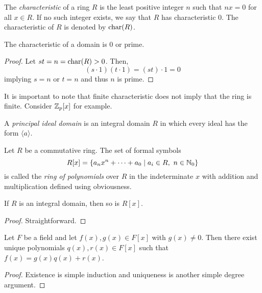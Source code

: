 \begin{definition}
    The \textit{characteristic} of a ring $R$ is the least positive integer $n$ such that $nx = 0$ for all $x\in R$. If no such integer exists, we say that $R$ has characteristic $0$. The characteristic of $R$ is denoted by $\operatornamewithlimits{char}(R)$.
\end{definition}

\begin{lemma}
    The characteristic of a domain is 0 or prime.
\end{lemma}
\begin{proof}
    Let $st = n = \operatornamewithlimits{char}(R) > 0$. Then, 
    \begin{equation*}
        (s\cdot 1)(t\cdot 1) = (st)\cdot 1 = 0
    \end{equation*}
    implying $s = n$ or $t = n$ and thus $n$ is prime.
\end{proof}

It is important to note that finite characteristic does not imply that the ring is finite. Consider $\mathbb{Z}_p[x]$ for example.

\begin{definition}
    A \textit{principal ideal domain} is an integral domain $R$ in which every ideal has the form $\langle a\rangle$.
\end{definition}

\begin{definition}
    Let $R$ be a commutative ring. The set of formal symbols 
    \begin{equation*}
        R[x] = \{a_nx^n + \cdots + a_0\mid a_i\in R,~ n\in\mathbb{N}_0\}
    \end{equation*}
    is called the \textit{ring of polynomials} over $R$ in the indeterminate $x$ with addition and multiplication defined using obviousness.
\end{definition}

\begin{lemma}
    If $R$ is an integral domain, then so is $R[x]$.
\end{lemma}
\begin{proof}
    Straightforward.
\end{proof}

\begin{theorem}
    Let $F$ be a field and let $f(x),g(x)\in F[x]$ with $g(x)\ne 0$. Then there exist unique polynomials $q(x), r(x)\in F[x]$ such that $f(x) = g(x)q(x) + r(x)$.
\end{theorem}
\begin{proof}
    Existence is simple induction and uniqueness is another simple degree argument.
\end{proof}


